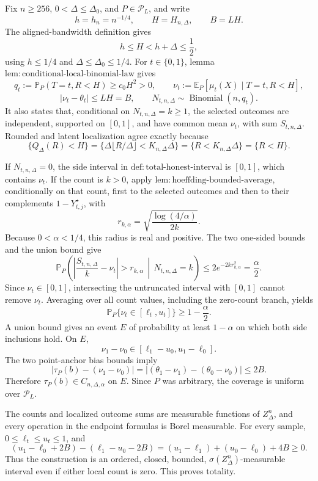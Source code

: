 Fix \(n\geq256\), \(0<\Delta\leq\Delta_0\), and \(P\in\mathcal P_L\), and write
\[
 h=h_n=n^{-1/4},\qquad H=H_{n,\Delta},\qquad B=LH.
\]
The aligned-bandwidth definition gives
\[
 h\leq H<h+\Delta\leq\frac12,
\]
using \(h\leq1/4\) and \(\Delta\leq\Delta_0\leq1/4\).  For \(t\in\{0,1\}\), lemma \(\mathrm{lem:conditional\text{-}local\text{-}binomial\text{-}law}\) gives
\[
 q_t:=\mathbb P_P(T=t,R<H)\geq c_0H^2>0,
 \qquad
 \nu_t:=\mathbb E_P[\mu_t(X)\mid T=t,R<H],
\]
\[
 |\nu_t-\theta_t|\leq LH=B,
 \qquad
 N_{t,n,\Delta}\sim\operatorname{Binomial}(n,q_t).
\]
It also states that, conditional on \(N_{t,n,\Delta}=k\geq1\), the selected outcomes are independent, supported on \([0,1]\), and have common mean \(\nu_t\), with sum \(S_{t,n,\Delta}\).  Rounded and latent localization agree exactly because
\[
 \{Q_\Delta(R)<H\}
 =\{\Delta\lfloor R/\Delta\rfloor<K_{n,\Delta}\Delta\}
 =\{R<K_{n,\Delta}\Delta\}
 =\{R<H\}.
\]

If \(N_{t,n,\Delta}=0\), the side interval in \(\mathrm{def:total\text{-}honest\text{-}interval}\) is \([0,1]\), which contains \(\nu_t\).  If the count is \(k>0\), apply \(\mathrm{lem:hoeffding\text{-}bounded\text{-}average}\), conditionally on that count, first to the selected outcomes and then to their complements \(1-Y_{t,j}^{\star}\), with
\[
 r_{k,\alpha}=\sqrt{\frac{\log(4/\alpha)}{2k}}.
\]
Because \(0<\alpha<1/4\), this radius is real and positive.  The two one-sided bounds and the union bound give
\[
 \mathbb P_P\!\left(\left|\frac{S_{t,n,\Delta}}k-\nu_t\right|>r_{k,\alpha}\,\middle|\,N_{t,n,\Delta}=k\right)
 \leq2e^{-2kr_{k,\alpha}^2}=\frac\alpha2.
\]
Since \(\nu_t\in[0,1]\), intersecting the untruncated interval with \([0,1]\) cannot remove \(\nu_t\).  Averaging over all count values, including the zero-count branch, yields
\[
 \mathbb P_P\{\nu_t\in[\ell_t,u_t]\}\geq1-\frac\alpha2.
\]
A union bound gives an event \(E\) of probability at least \(1-\alpha\) on which both side inclusions hold.  On \(E\),
\[
 \nu_1-\nu_0\in[\ell_1-u_0,u_1-\ell_0].
\]
The two point-anchor bias bounds imply
\[
 |\tau_P(b)-(\nu_1-\nu_0)|
 =| (\theta_1-\nu_1)-(\theta_0-\nu_0)|
 \leq2B.
\]
Therefore \(\tau_P(b)\in C_{n,\Delta,\alpha}\) on \(E\).  Since \(P\) was arbitrary, the coverage is uniform over \(\mathcal P_L\).

The counts and localized outcome sums are measurable functions of \(Z_\Delta^n\), and every operation in the endpoint formulas is Borel measurable.  For every sample, \(0\leq\ell_t\leq u_t\leq1\), and
\[
 (u_1-\ell_0+2B)-(\ell_1-u_0-2B)
 =(u_1-\ell_1)+(u_0-\ell_0)+4B\geq0.
\]
Thus the construction is an ordered, closed, bounded, \(\sigma(Z_\Delta^n)\)-measurable interval even if either local count is zero.  This proves totality.

